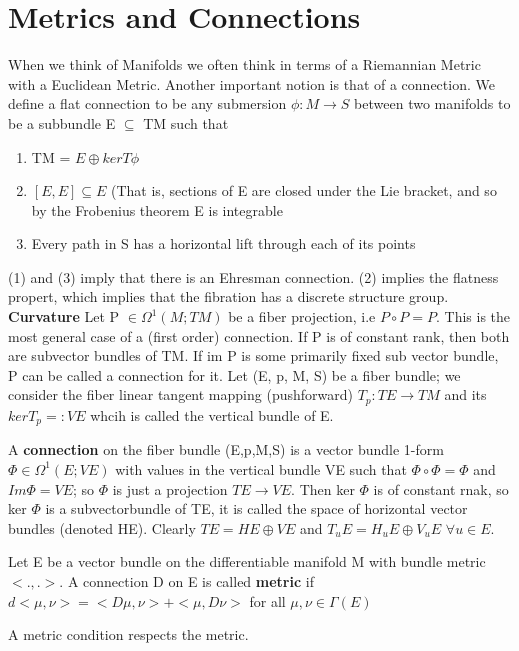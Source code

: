 \section{Metrics and Connections}
When we think of Manifolds we often think in terms of a Riemannian Metric with a Euclidean Metric. Another important 
notion is that of a connection. 
We define a flat connection to be any submersion $\phi: M \rightarrow S$ between two manifolds to be a subbundle
E $\subseteq$ TM such that
\begin{enumerate}
 \item TM = $E \oplus ker T\phi$
\item $[E,E] \subseteq E$ (That is, sections of E are closed under the Lie bracket, and so by the Frobenius theorem E 
is integrable
\item Every path in S has a horizontal lift through each of its points
\end{enumerate}
(1) and (3) imply that there is an Ehresman connection.
(2) implies the flatness propert, which implies that the fibration has a discrete structure group.
\textbf{Curvature}
Let P $\in \Omega^{1}(M;TM)$ be a fiber projection, i.e $P \circ P = P$. This is the most general case of a (first
order) connection. If P is of constant rank, then both are subvector bundles of TM. If im P is some primarily fixed
sub vector bundle, P can be called a connection for it. Let (E, p, M, S) be a fiber bundle; we consider the fiber linear
tangent mapping (pushforward) $T_p: TE \rightarrow TM$ and its $ker T_{p} =: VE$ whcih is called the vertical bundle
of E. 
\begin{dfn}
 A \textbf{connection} on the fiber bundle (E,p,M,S) is a vector bundle 1-form $\Phi \in \Omega^{1}(E; VE)$ with
values in the vertical bundle VE such that $\Phi \circ \Phi = \Phi$ and $Im \Phi = VE$; so $\Phi$ is just a projection
$TE \rightarrow VE$. Then ker $\Phi$ is of constant rnak, so ker $\Phi$ is a subvectorbundle of TE, it is called the space 
of horizontal vector bundles (denoted HE). Clearly $TE = HE \oplus VE$ and 
$T_u E = H_u E \oplus V_u E$ $\forall u \in E$.
\end{dfn}
 
\begin{dfn}
 Let E be a vector bundle on the differentiable manifold M with bundle metric $<.,.>$. A connection D on E is called \textbf{metric}
if $d<\mu,\nu>=<D\mu,\nu> +<\mu, D\nu>$ for all $\mu, \nu \in \Gamma(E)$
\end{dfn}
A metric condition respects the metric. 

